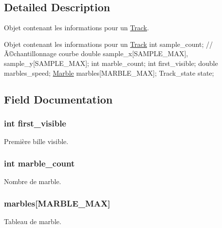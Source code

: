 \subsection{Detailed Description}
Objet contenant les informations pour un \hyperlink{struct_track}{Track}. 

Objet contenant les informations pour un \hyperlink{struct_track}{Track} int sample\+\_\+count; // Ã©chantillonnage courbe double sample\+\_\+x\mbox{[}S\+A\+M\+P\+L\+E\+\_\+\+M\+AX\mbox{]}, sample\+\_\+y\mbox{[}S\+A\+M\+P\+L\+E\+\_\+\+M\+AX\mbox{]}; int marble\+\_\+count; int first\+\_\+visible; double marbles\+\_\+speed; \hyperlink{struct_marble}{Marble} marbles\mbox{[}M\+A\+R\+B\+L\+E\+\_\+\+M\+AX\mbox{]}; Track\+\_\+state state; 

\subsection{Field Documentation}
\subsubsection[{\texorpdfstring{first\+\_\+visible}{first_visible}}]{\setlength{\rightskip}{0pt plus 5cm}int first\+\_\+visible}\hypertarget{struct_track_a5186ecb1e6c5695791274cd52cac839c}{}\label{struct_track_a5186ecb1e6c5695791274cd52cac839c}
Première bille visible. 
\subsubsection[{\texorpdfstring{marble\+\_\+count}{marble_count}}]{\setlength{\rightskip}{0pt plus 5cm}int marble\+\_\+count}\hypertarget{struct_track_a59a42793ead243ec50ad584730b1fdab}{}\label{struct_track_a59a42793ead243ec50ad584730b1fdab}
Nombre de marble. 
\subsubsection[{\texorpdfstring{marbles}{marbles}}]{ marbles\mbox{[}M\+A\+R\+B\+L\+E\+\_\+\+M\+AX\mbox{]}}\hypertarget{struct_track_a90e02a52ca50397997058e7b8dbab421}{}\label{struct_track_a90e02a52ca50397997058e7b8dbab421}
Tableau de marble. 
